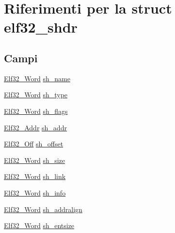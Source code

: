 \hypertarget{structelf32__shdr}{\section{Riferimenti per la struct elf32\+\_\+shdr}
\label{structelf32__shdr}
}
\subsection*{Campi}
\begin{DoxyCompactItemize}
\item 
\hyperlink{exec_8c_af5924ece606c732e86f8263a19408e45}{Elf32\+\_\+\+Word} \hyperlink{structelf32__shdr_aed9d0aea452a9da6af712011a65bdc2f}{sh\+\_\+name}
\item 
\hyperlink{exec_8c_af5924ece606c732e86f8263a19408e45}{Elf32\+\_\+\+Word} \hyperlink{structelf32__shdr_ab82e07582eb07fc53eec4dca36dddc83}{sh\+\_\+type}
\item 
\hyperlink{exec_8c_af5924ece606c732e86f8263a19408e45}{Elf32\+\_\+\+Word} \hyperlink{structelf32__shdr_a16f22e73ee4f9a4e8dbab7f44eaaa878}{sh\+\_\+flags}
\item 
\hyperlink{exec_8c_a40c6d4571e6001f443cc6a6474620158}{Elf32\+\_\+\+Addr} \hyperlink{structelf32__shdr_a7054ce2ce815d205d451bfe7ce2e145e}{sh\+\_\+addr}
\item 
\hyperlink{exec_8c_a655751f9b317369b93c581ea8ed84516}{Elf32\+\_\+\+Off} \hyperlink{structelf32__shdr_a4dea3a6fbd3a62a649d327b515c70cd6}{sh\+\_\+offset}
\item 
\hyperlink{exec_8c_af5924ece606c732e86f8263a19408e45}{Elf32\+\_\+\+Word} \hyperlink{structelf32__shdr_a4addb97e16e7303912fc84daa6f3ac77}{sh\+\_\+size}
\item 
\hyperlink{exec_8c_af5924ece606c732e86f8263a19408e45}{Elf32\+\_\+\+Word} \hyperlink{structelf32__shdr_a8e1564e04f3834397b394190934f7cee}{sh\+\_\+link}
\item 
\hyperlink{exec_8c_af5924ece606c732e86f8263a19408e45}{Elf32\+\_\+\+Word} \hyperlink{structelf32__shdr_a7063aa23af4d41832485d03b54f01626}{sh\+\_\+info}
\item 
\hyperlink{exec_8c_af5924ece606c732e86f8263a19408e45}{Elf32\+\_\+\+Word} \hyperlink{structelf32__shdr_a74275f49dbae08127832dc1061ed24ab}{sh\+\_\+addralign}
\item 
\hyperlink{exec_8c_af5924ece606c732e86f8263a19408e45}{Elf32\+\_\+\+Word} \hyperlink{structelf32__shdr_a0360b455d1586deda50df0adaa7a87e0}{sh\+\_\+entsize}
\end{DoxyCompactItemize}


